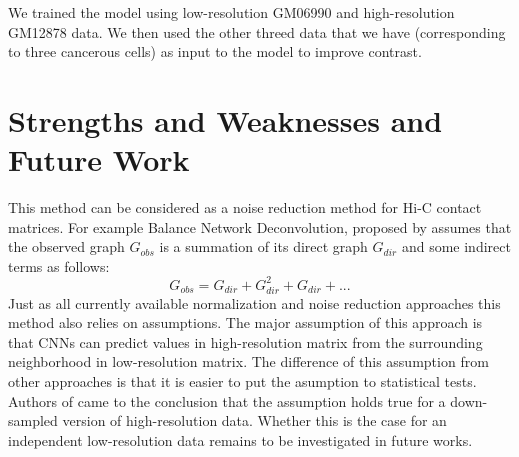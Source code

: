 \documentclass{article}
\begin{document}
We trained the model using low-resolution 
 GM06990 and high-resolution
 GM12878 data. We then used the other threed
 data that we have (corresponding to three
 cancerous cells) as input to the model to 
 improve contrast.
\section{Strengths and Weaknesses and Future Work}
This method can be considered as a noise reduction method
for Hi-C contact matrices. 
For example Balance Network Deconvolution,
proposed by \cite{feizi2013network}
assumes that the observed graph $G_{obs}$ is a summation of its
direct graph $G_{dir}$ and some indirect terms as follows:
\begin{equation}
        \label{indirect_effects}
            G_{obs} = G_{dir} + G_{dir}^2 + G_{dir} + ...
\end{equation}
Just as all currently available
normalization and noise reduction approaches this method
also relies on assumptions. The major assumption of this
approach is that CNNs can predict values in high-resolution
matrix from the surrounding neighborhood in low-resolution
matrix. The difference of this assumption from other 
approaches is that it is easier to put the asumption to
statistical tests. Authors of \cite{zhang2018enhancing}
came to the conclusion that the assumption holds true for
a down-sampled version of high-resolution data. Whether
this is the case for an independent low-resolution data
remains to be investigated in future works.





\begin{acronym}
\end{acronym}
\end{document}
